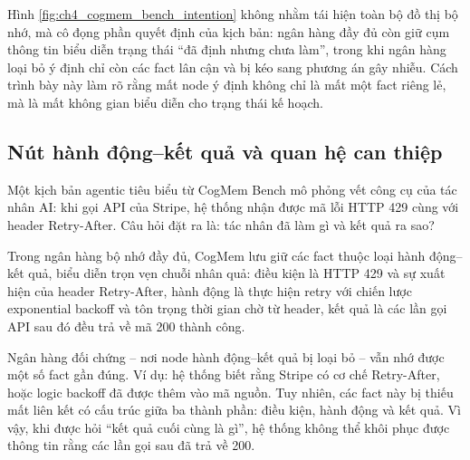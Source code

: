\documentclass[../main.tex]{subfiles}
\begin{document}
Hình \ref{fig:ch4_cogmem_bench_intention} không nhằm tái hiện toàn bộ đồ thị bộ nhớ, mà cô đọng phần quyết định của kịch bản: ngân hàng đầy đủ còn giữ cụm thông tin biểu diễn trạng thái ``đã định nhưng chưa làm'', trong khi ngân hàng loại bỏ ý định chỉ còn các fact lân cận và bị kéo sang phương án gây nhiễu. Cách trình bày này làm rõ rằng mất node ý định không chỉ là mất một fact riêng lẻ, mà là mất không gian biểu diễn cho trạng thái kế hoạch.

\subsection{Nút hành động--kết quả và quan hệ can thiệp}

Một kịch bản agentic tiêu biểu từ CogMem Bench mô phỏng vết công cụ của tác nhân AI: khi gọi API của Stripe, hệ thống nhận được mã lỗi HTTP 429 cùng với header Retry-After. Câu hỏi đặt ra là: tác nhân đã làm gì và kết quả ra sao?

Trong ngân hàng bộ nhớ đầy đủ, CogMem lưu giữ các fact thuộc loại hành động--kết quả, biểu diễn trọn vẹn chuỗi nhân quả: điều kiện là HTTP 429 và sự xuất hiện của header Retry-After, hành động là thực hiện retry với chiến lược exponential backoff và tôn trọng thời gian chờ từ header, kết quả là các lần gọi API sau đó đều trả về mã 200 thành công.

Ngân hàng đối chứng -- nơi node hành động--kết quả bị loại bỏ -- vẫn nhớ được một số fact gần đúng. Ví dụ: hệ thống biết rằng Stripe có cơ chế Retry-After, hoặc logic backoff đã được thêm vào mã nguồn. Tuy nhiên, các fact này bị thiếu mất liên kết có cấu trúc giữa ba thành phần: điều kiện, hành động và kết quả. Vì vậy, khi được hỏi ``kết quả cuối cùng là gì'', hệ thống không thể khôi phục được thông tin rằng các lần gọi sau đã trả về 200.
\end{document}
